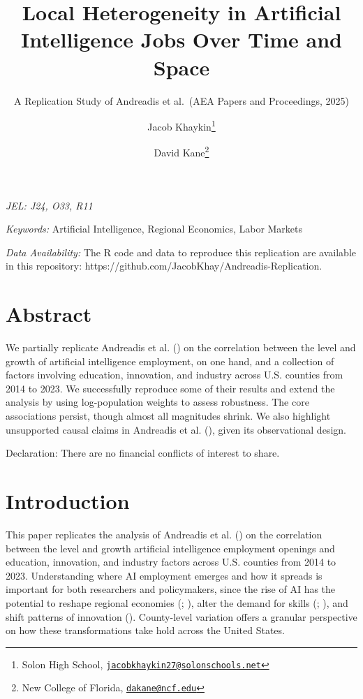 \documentclass[
]{article}
\title{Local Heterogeneity in Artificial Intelligence Jobs Over Time and
Space}
\subtitle{A Replication Study of Andreadis et al.~(AEA Papers and
Proceedings, 2025)}
\author{Jacob Khaykin\footnote{Solon High School,
  \href{mailto:jacobkhaykin27@solonschools.net}{\nolinkurl{jacobkhaykin27@solonschools.net}}} \and David
Kane\footnote{New College of Florida,
  \href{mailto:dakane@ncf.edu}{\nolinkurl{dakane@ncf.edu}}}}
\date{}
\begin{document}
\maketitle


\emph{JEL: J24, O33, R11}

\emph{Keywords:} Artificial Intelligence, Regional Economics, Labor
Markets

\emph{Data Availability:} The R code and data to reproduce this
replication are available in this repository:
https://github.com/JacobKhay/Andreadis-Replication.

\section*{Abstract}\label{abstract}

We partially replicate Andreadis et al.
() on the correlation between the
level and growth of artificial intelligence employment, on one hand, and
a collection of factors involving education, innovation, and industry
across U.S. counties from 2014 to 2023. We successfully reproduce some
of their results and extend the analysis by using log-population weights
to assess robustness. The core associations persist, though almost all
magnitudes shrink. We also highlight unsupported causal claims in
Andreadis et al. (), given its
observational design.

Declaration: There are no financial conflicts of interest to share.

\newpage

\section{Introduction}\label{introduction}

This paper replicates the analysis of Andreadis et al.
() on the correlation between the
level and growth artificial intelligence employment openings and
education, innovation, and industry factors across U.S. counties from
2014 to 2023. Understanding where AI employment emerges and how it
spreads is important for both researchers and policymakers, since the
rise of AI has the potential to reshape regional economies
(;
), alter the demand for skills
(;
), and shift patterns of innovation
(). County-level variation
offers a granular perspective on how these transformations take hold
across the United States.
\end{document}
